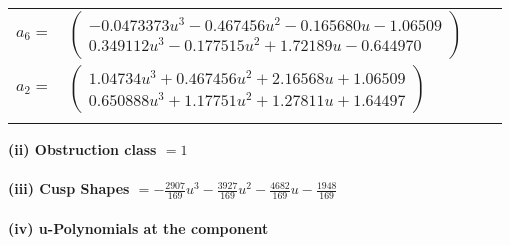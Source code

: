 \documentclass[1p]{elsarticle_modified}
\theoremstyle{definition}
\begin{document}
\begin{tabular}{m{7pt} m{180pt} m{7pt} m{180pt} }
\flushright $a_{6}=$&$\begin{pmatrix}-0.0473373 u^{3}-0.467456 u^{2}-0.165680 u-1.06509\\0.349112 u^{3}-0.177515 u^{2}+1.72189 u-0.644970\end{pmatrix}$ \\
\flushright $a_{2}=$&$\begin{pmatrix}1.04734 u^{3}+0.467456 u^{2}+2.16568 u+1.06509\\0.650888 u^{3}+1.17751 u^{2}+1.27811 u+1.64497\end{pmatrix}$\\&\end{tabular}
\flushleft \textbf{(ii) Obstruction class $= 1$}\\~\\
\flushleft \textbf{(iii) Cusp Shapes $= -\frac{2907}{169} u^3-\frac{3927}{169} u^2-\frac{4682}{169} u-\frac{1948}{169}$}\\~\\
\newpage\renewcommand{\arraystretch}{1}
\flushleft \textbf{(iv) u-Polynomials at the component}\newline \\
\end{document}
